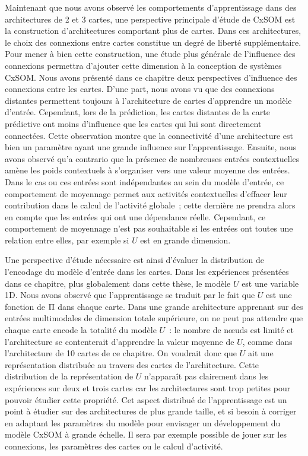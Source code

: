 \documentclass[../main]{subfiles}
\begin{document}
Maintenant que nous avons observé les comportements d'apprentissage dans des architectures de 2 et 3 cartes, une perspective principale d'étude de CxSOM est la construction d'architectures comportant plus de cartes.
Dans ces architectures, le choix des connexions entre cartes constitue un degré de liberté supplémentaire.
Pour mener à bien cette construction, une étude plus générale de l'influence des connexions permettra d'ajouter cette dimension à la conception de systèmes CxSOM.
Nous avons présenté dans ce chapitre deux perspectives d'influence des connexions entre les cartes.
D'une part, nous avons vu que des connexions distantes permettent toujours à l'architecture de cartes d'apprendre un modèle d'entrée. Cependant, lors de la prédiction, les cartes distantes de la carte prédictive ont moins d'influence que les cartes qui lui sont directement connectées. Cette observation montre que la connectivité d'une architecture est bien un paramètre ayant une grande influence sur l'apprentissage. 
Ensuite, nous avons observé qu'a contrario que la présence de nombreuses entrées contextuelles amène les poids contextuels à s'organiser vers une valeur moyenne des entrées. Dans le cas ou ces entrées sont indépendantes au sein du modèle d'entrée, ce comportement de moyennage permet aux activités contextuelles d'effacer leur contribution dans le calcul de l'activité globale~; cette dernière ne prendra alors en compte que les entrées qui ont une dépendance réelle.
Cependant, ce comportement de moyennage n'est pas souhaitable si les entrées ont toutes une relation entre elles, par exemple si $U$ est en grande dimension.


Une perspective d'étude nécessaire est ainsi d'évaluer la distribution de l'encodage du modèle d'entrée dans les cartes. 
Dans les expériences présentées dans ce chapitre, plus globalement dans cette thèse, le modèle $U$ est une variable 1D. 
Nous avons observé que l'apprentissage se traduit par le fait que $U$ est une fonction de $\Pi$ dans chaque carte.
Dans une grande architecture apprenant sur des entrées multimodales de dimension totale supérieure, on ne peut pas attendre que chaque carte encode la totalité du modèle $U$~: le nombre de n\oe{}uds est limité et l'architecture se contenterait d'apprendre la valeur moyenne de $U$, comme dans l'architecture de 10 cartes de ce chapitre.
On voudrait donc que $U$ ait une représentation distribuée au travers des cartes de l'architecture. 
Cette distribution de la représentation de $U$ n'apparaît pas clairement dans les expériences sur deux et trois cartes car les architectures sont trop petites pour pouvoir étudier cette propriété.
Cet aspect distribué de l'apprentissage est un point à étudier sur des architectures de plus grande taille, et si besoin à corriger en adaptant les paramètres du modèle pour envisager un développement du modèle CxSOM à grande échelle. 
Il sera par exemple possible de jouer sur les connexions, les paramètres des cartes ou le calcul d'activité.
\end{document}
